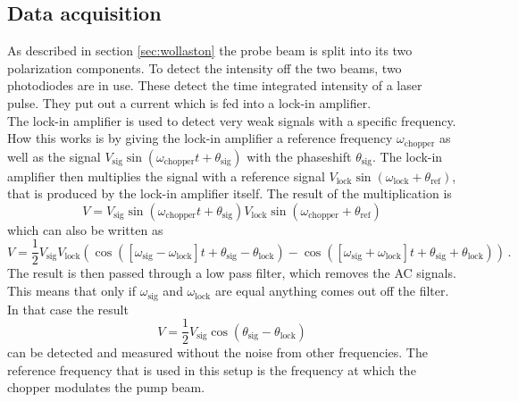 \subsection{Data acquisition}
\label{sec:data_acq}
As described in section \ref{sec:wollaston} the probe beam is split into its two polarization components.
To detect the intensity off the two beams, two photodiodes are in use.
These detect the time integrated intensity of a laser pulse.
They put out a current which is fed into a lock-in amplifier.
\\
The lock-in amplifier is used to detect very weak signals with a specific frequency.
How this works is by giving the lock-in amplifier a reference frequency $\omega_\text{chopper}$ as well as the signal $V_\text{sig}\sin(\omega_\text{chopper}t + \theta_\text{sig})$ with the phaseshift $\theta_\text{sig}$.
The lock-in amplifier then multiplies the signal with a reference signal $V_\text{lock}\sin(\omega_\text{lock} + \theta_\text{ref})$, that is produced by the lock-in amplifier itself.
The result of the multiplication is
\begin{equation}
    V = V_\text{sig}\sin(\omega_\text{chopper}t + \theta_\text{sig})V_\text{lock}\sin(\omega_\text{chopper} + \theta_\text{ref})
\end{equation}
which can also be written as 
\begin{equation}
    V = \frac{1}{2} V_\text{sig} V_\text{lock} \left ( \cos([\omega_\text{sig} - \omega_\text{lock}]t +\theta_\text{sig} - \theta_\text{lock}) - \cos([\omega_\text{sig} + \omega_\text{lock}]t +\theta_\text{sig} + \theta_\text{lock})\right ) \, .
\end{equation}
The result is then passed through a low pass filter, which removes the AC signals.
This means that only if $\omega_\text{sig}$ and $\omega_\text{lock}$ are equal anything comes out off the filter.
In that case the result 
\begin{equation}
    V = \frac{1}{2}V_\text{sig}\cos(\theta_\text{sig}-\theta_\text{lock})
\end{equation} 
can be detected and measured without the noise from other frequencies.
The reference frequency that is used in this setup is the frequency at which the chopper modulates the pump beam.

